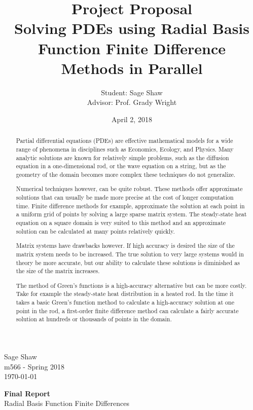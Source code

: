 \documentclass[12pt]{article}
\title{Project Proposal\\ \large Solving PDEs using Radial Basis Function Finite Difference Methods in Parallel}
\author{Student: Sage Shaw\\ Advisor: Prof. Grady Wright}
\date{April 2, 2018}
\begin{document}
	\thispagestyle{empty}
	
	\begin{flushright}
		Sage Shaw \\
		m566 - Spring 2018 \\
		\today
	\end{flushright}
	
	\begin{center}
		\Huge \textbf{Final Report} \\
		\large Radial Basis Function Finite Differences
	\end{center}

\begin{abstract}

	Partial differential equations (PDEs) are effective mathematical models for a wide range of phenomena in disciplines such as Economics, Ecology, and Physics. Many analytic solutions are known for relatively simple problems, such as the diffusion equation in a one-dimensional rod, or the wave equation on a string, but as the geometry of the domain becomes more complex these techniques do not generalize. 
	
	Numerical techniques however, can be quite robust. These methods offer approximate solutions that can usually be made more precise at the cost of longer computation time. Finite difference methods for example, approximate the solution at each point in a uniform grid of points by solving a large sparse matrix system. The steady-state heat equation on a square domain is very suited to this method and an approximate solution can be calculated at many points relatively quickly. 
	
	Matrix systems have drawbacks however. If high accuracy is desired the size of the matrix system needs to be increased. The true solution to very large systems would in theory be more accurate, but our ability to calculate these solutions is diminished as the size of the matrix increases.
	
	The method of Green's functions is a high-accuracy alternative but can be more costly. Take for example the steady-state heat distribution in a heated rod. In the time it takes a basic Green's function method to calculate a high-accuracy solution at one point in the rod, a first-order finite difference method can calculate a fairly accurate solution at hundreds or thousands of points in the domain. 
	

\end{abstract}
\end{document}
